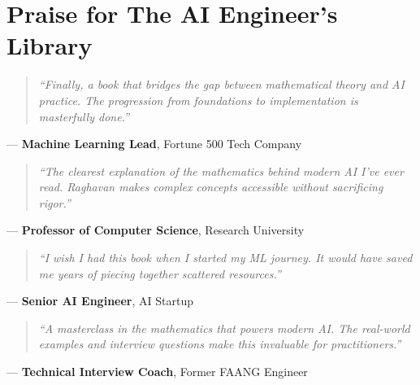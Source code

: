 \documentclass[../main.tex]{subfiles}
\begin{document}
\chapter*{Praise for The AI Engineer's Library}
\thispagestyle{empty}

\begin{quote}
\large\itshape
``Finally, a book that bridges the gap between mathematical theory and AI practice. The progression from foundations to implementation is masterfully done.''
\end{quote}
\hfill--- \textbf{Machine Learning Lead}, Fortune 500 Tech Company

\vspace{1cm}

\begin{quote}
\large\itshape
``The clearest explanation of the mathematics behind modern AI I've ever read. Raghavan makes complex concepts accessible without sacrificing rigor.''
\end{quote}
\hfill--- \textbf{Professor of Computer Science}, Research University

\vspace{1cm}

\begin{quote}
\large\itshape
``I wish I had this book when I started my ML journey. It would have saved me years of piecing together scattered resources.''
\end{quote}
\hfill--- \textbf{Senior AI Engineer}, AI Startup

\vspace{1cm}

\begin{quote}
\large\itshape
``A masterclass in the mathematics that powers modern AI. The real-world examples and interview questions make this invaluable for practitioners.''
\end{quote}
\hfill--- \textbf{Technical Interview Coach}, Former FAANG Engineer

\cleardoublepage
\end{document}
